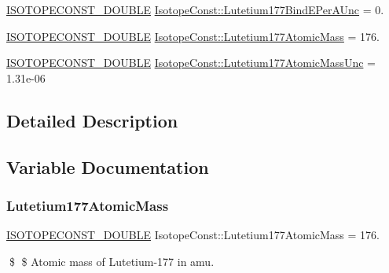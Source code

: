 \begin{DoxyCompactItemize}
\mbox{\hyperlink{group___isotope_const-_macros_ga8f45a7272ce02c0b4c65c44636ed719a}{I\+S\+O\+T\+O\+P\+E\+C\+O\+N\+S\+T\+\_\+\+D\+O\+U\+B\+LE}} \mbox{\hyperlink{group___isotope_const-_lutetium-_lu177_ga83abeaecb262d1f1f7642061a84146c3}{Isotope\+Const\+::\+Lutetium177\+Bind\+E\+Per\+A\+Unc}} = 0.
\item 
\mbox{\hyperlink{group___isotope_const-_macros_ga8f45a7272ce02c0b4c65c44636ed719a}{I\+S\+O\+T\+O\+P\+E\+C\+O\+N\+S\+T\+\_\+\+D\+O\+U\+B\+LE}} \mbox{\hyperlink{group___isotope_const-_lutetium-_lu177_ga3c826bb8e121bdefa67c5f8cdcbac154}{Isotope\+Const\+::\+Lutetium177\+Atomic\+Mass}} = 176.
\item 
\mbox{\hyperlink{group___isotope_const-_macros_ga8f45a7272ce02c0b4c65c44636ed719a}{I\+S\+O\+T\+O\+P\+E\+C\+O\+N\+S\+T\+\_\+\+D\+O\+U\+B\+LE}} \mbox{\hyperlink{group___isotope_const-_lutetium-_lu177_gaf6c435452161bf257eeaa2e5fb7bda15}{Isotope\+Const\+::\+Lutetium177\+Atomic\+Mass\+Unc}} = 1.\+31e-\/06
\end{DoxyCompactItemize}


\subsection{Detailed Description}


\subsection{Variable Documentation}
\mbox{\label{group___isotope_const-_lutetium-_lu177_ga3c826bb8e121bdefa67c5f8cdcbac154}} 
\subsubsection{\texorpdfstring{Lutetium177\+Atomic\+Mass}{Lutetium177AtomicMass}}
{\footnotesize\ttfamily \mbox{\hyperlink{group___isotope_const-_macros_ga8f45a7272ce02c0b4c65c44636ed719a}{I\+S\+O\+T\+O\+P\+E\+C\+O\+N\+S\+T\+\_\+\+D\+O\+U\+B\+LE}} Isotope\+Const\+::\+Lutetium177\+Atomic\+Mass = 176.}

\$ \$ Atomic mass of Lutetium-\/177 in amu. \mbox{\label{group___isotope_const-_lutetium-_lu177_gaf6c435452161bf257eeaa2e5fb7bda15}} 
